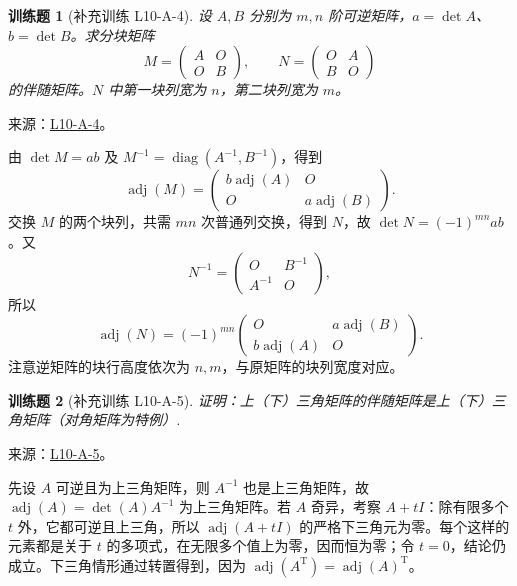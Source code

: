 \documentclass[12pt,fontset=fandol]{ctexart}
\newtheorem{exercise}{训练题}[section]
\begin{document}
\begin{exercise}[补充训练 L10-A-4]\label{prob:L10-A-4}
设 $A,B$ 分别为 $m,n$ 阶可逆矩阵，$a=\det A$、$b=\det B$。求分块矩阵
\[M=\begin{pmatrix}A&O\\O&B\end{pmatrix},\qquad N=\begin{pmatrix}O&A\\B&O\end{pmatrix}\]
的伴随矩阵。$N$ 中第一块列宽为 $n$，第二块列宽为 $m$。
\end{exercise}
\noindent 来源：\href{https://github.com/yhwu-is/Linear-Algebra-Left-Undone/blob/new/%E8%AE%B2%E4%B9%89/%E4%B8%93%E9%A2%98/10%20%E8%A1%8C%E5%88%97%E5%BC%8F.tex}{L10-A-4}。
\begin{solve}
由 $\det M=ab$ 及 $M^{-1}=\operatorname{diag}(A^{-1},B^{-1})$，得到
\[\operatorname{adj}(M)=\begin{pmatrix}b\operatorname{adj}(A)&O\\O&a\operatorname{adj}(B)\end{pmatrix}.\]
交换 $M$ 的两个块列，共需 $mn$ 次普通列交换，得到 $N$，故 $\det N=(-1)^{mn}ab$。又
\[N^{-1}=\begin{pmatrix}O&B^{-1}\\A^{-1}&O\end{pmatrix},\]
所以
\[\operatorname{adj}(N)=(-1)^{mn}\begin{pmatrix}O&a\operatorname{adj}(B)\\b\operatorname{adj}(A)&O\end{pmatrix}.\]
注意逆矩阵的块行高度依次为 $n,m$，与原矩阵的块列宽度对应。
\end{solve}

\begin{exercise}[补充训练 L10-A-5]\label{prob:L10-A-5}
证明：上（下）三角矩阵的伴随矩阵是上（下）三角矩阵（对角矩阵为特例）.
\end{exercise}
\noindent 来源：\href{https://github.com/yhwu-is/Linear-Algebra-Left-Undone/blob/new/%E8%AE%B2%E4%B9%89/%E4%B8%93%E9%A2%98/10%20%E8%A1%8C%E5%88%97%E5%BC%8F.tex}{L10-A-5}。
\begin{solve}
先设 $A$ 可逆且为上三角矩阵，则 $A^{-1}$ 也是上三角矩阵，故 $\operatorname{adj}(A)=\det(A)A^{-1}$ 为上三角矩阵。若 $A$ 奇异，考察 $A+tI$：除有限多个 $t$ 外，它都可逆且上三角，所以 $\operatorname{adj}(A+tI)$ 的严格下三角元为零。每个这样的元素都是关于 $t$ 的多项式，在无限多个值上为零，因而恒为零；令 $t=0$，结论仍成立。下三角情形通过转置得到，因为 $\operatorname{adj}(A^{\mathrm T})=\operatorname{adj}(A)^{\mathrm T}$。
\end{solve}
\end{document}
